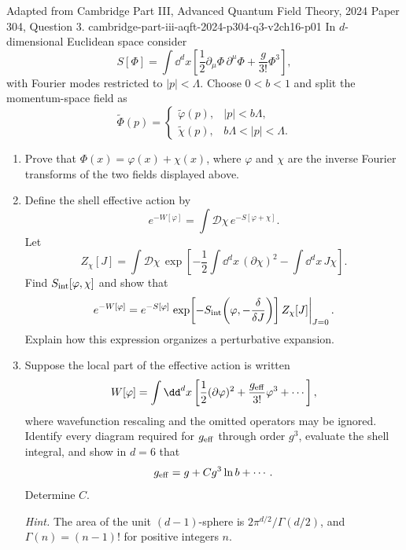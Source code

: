 
\begin{enumerate}
  {Adapted from Cambridge Part III, Advanced Quantum Field Theory,
  2024 Paper 304, Question 3.}
  {cambridge-part-iii-aqft-2024-p304-q3-v2ch16-p01}
  In \(d\)-dimensional Euclidean space consider
  \[
    S[\Phi]=\int \dd^dx\left[
      \frac12\partial_\mu\Phi\,\partial^\mu\Phi+
      \frac{g}{3!}\Phi^3\right],
  \]
  with Fourier modes restricted to \(|p|<\Lambda\).  Choose
  \(0<b<1\) and split the momentum-space field as
  \[
    \widetilde\Phi(p)=
    \begin{cases}
      \widetilde\varphi(p),& |p|<b\Lambda,\\
      \widetilde\chi(p),& b\Lambda<|p|<\Lambda.
    \end{cases}
  \]
  \begin{enumerate}
    \item[(a)]
    Prove that \(\Phi(x)=\varphi(x)+\chi(x)\), where
    \(\varphi\) and \(\chi\) are the inverse Fourier transforms of the two
    fields displayed above.
    \item[(b)]
    Define the shell effective action by
    \[
      e^{-W[\varphi]}=\int\mathcal D\chi\,e^{-S[\varphi+\chi]}.
    \]
    Let
    \[
      Z_\chi[J]=\int\mathcal D\chi\,
      \exp\left[-\frac12\int \dd^dx\,(\partial\chi)^2
      -\int \dd^dx\,J\chi\right].
    \]
    Find \(S_{\rm int}[\varphi,\chi]\) and show that
    \[
      e^{-W[\varphi]}=
      e^{-S[\varphi]}
      \left.
      \exp\!\left[-S_{\rm int}
        \!\left(\varphi,-\frac{\delta}{\delta J}\right)\right]
      Z_\chi[J]\right|_{J=0}.
    \]
    Explain how this expression organizes a perturbative expansion.
    \item[(c)]
    Suppose the local part of the effective action is written
    \[
      W[\varphi]=\int \dd^dx\left[
        \frac12(\partial\varphi)^2+
        \frac{g_{\rm eff}}{3!}\varphi^3+\cdots\right],
    \]
    where wavefunction rescaling and the omitted operators may be ignored.
    Identify every diagram required for \(g_{\rm eff}\) through order
    \(g^3\), evaluate the shell integral, and show in \(d=6\) that
    \[
      g_{\rm eff}=g+Cg^3\ln b+\cdots .
    \]
    Determine \(C\).

    \emph{Hint.}  The area of the unit \((d-1)\)-sphere is
    \(2\pi^{d/2}/\Gamma(d/2)\), and
    \(\Gamma(n)=(n-1)!\) for positive integers \(n\).
  \end{enumerate}


\end{enumerate}
